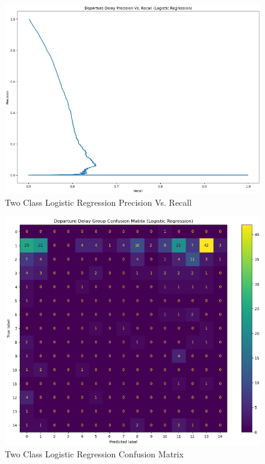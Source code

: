 \documentclass[a4paper,12pt]{article}
\begin{document}
\begin{figure}
    \centering
    \includegraphics*[scale=.45]{../../img/model_rq2_prec_recall.png}
    \caption[]{Two Class Logistic Regression Precision Vs. Recall}
    \label{fig:model:rq2:prec_recall}
\end{figure}

\begin{figure}
    \centering
    \includegraphics*[scale=.50]{../../img/model_rq2_cfmtrx_2.png}
    \caption[]{Two Class Logistic Regression Confusion Matrix}
    \label{fig:model:rq2:cfmtrx_2}
\end{figure}
\end{document}
